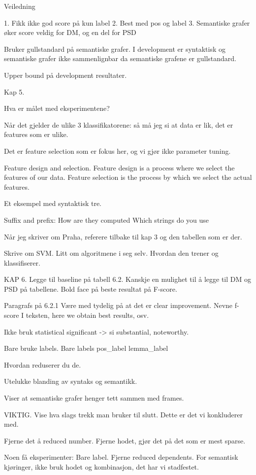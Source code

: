 Veiledning

1. Fikk ikke god score på kun label
2. Best med pos og label
3. Semantiske grafer øker score veldig for DM, og en del for PSD

Bruker gullstandard på semantiske grafer. I development er syntaktisk og semantiske grafer ikke sammenlignbar da semantiske grafene er gullstandard. 

Upper bound på development resultater.


Kap 5. 

Hva er målet med eksperimentene? 

Når det gjelder de ulike 3 klassifikatorene: så må jeg si at data er lik, det er features som er ulike.

Det er feature selection som er fokus her, og vi gjør ikke parameter tuning. 

Feature design and selection.
	Feature design is a process where we select the features of our data.
	Feature selection is the process by which we select the actual features. 

Et eksempel med syntaktisk tre.

Suffix and prefix:
	How are they computed
	Which strings do you use


Når jeg skriver om Praha, referere tilbake til kap 3 og den tabellen som er der.

Skrive om SVM. Litt om algoritmene i seg selv. Hvordan den trener og klassifiserer. 


KAP 6. 
Legge til baseline på tabell 6.2. 
Kanskje en mulighet til å legge til DM og PSD på tabellene. 
Bold face på beste resultat på F-score.

Paragrafs på 6.2.1
Være med tydelig på at det er clear improvement.
Nevne f-score I teksten, here we obtain best results, osv. 

Ikke bruk statistical significant -> si substantial, noteworthy.


Bare bruke labels.
Bare labels
pos\_label
lemma\_label

Hvordan reduserer du de.

Utelukke blanding av syntaks og semantikk.

Viser at semantiske grafer henger tett sammen med frames.

VIKTIG. 
Vise hva slags trekk man bruker til slutt. Dette er det vi konkluderer med.

Fjerne det å reduced number.
Fjerne hodet, gjør det på det som er mest sparse.

Noen få eksperimenter:
	Bare label. Fjerne reduced dependents. 
	For semantisk kjøringer, ikke bruk hodet og kombinasjon, det har vi stadfestet. 









